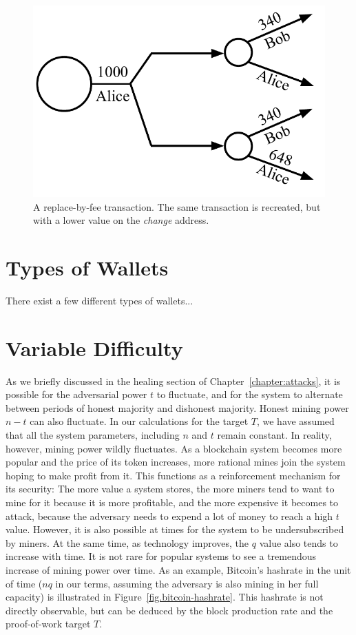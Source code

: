 \begin{figure}[h]
  \centering
  \includegraphics[width=0.4 \columnwidth,keepaspectratio]{figures/replace-by-fee.pdf}
  \caption{A replace-by-fee transaction. The same transaction is recreated, but with
           a lower value on the \emph{change} address.}
  \label{fig.replace-by-fee}
\end{figure}

\section{Types of Wallets}

There exist a few different types of wallets...

\section{Variable Difficulty}

As we briefly discussed in the healing section of Chapter~\ref{chapter:attacks},
it is possible for the adversarial power $t$ to fluctuate, and for the system to
alternate between periods of honest majority and dishonest majority.
Honest mining power $n - t$ can also fluctuate. In our calculations for the target $T$,
we have assumed that all the system parameters, including $n$ and $t$ remain
constant. In reality, however, mining power wildly fluctuates. As a blockchain
system becomes more popular and the price of its token increases,
more rational mines join the system hoping to make profit from it. This functions
as a reinforcement mechanism for its security: The more value a system stores,
the more miners tend to want to mine for it because it is more profitable, and
the more expensive it becomes to attack, because the adversary needs to
expend a lot of money to reach a high $t$ value. However, it is also possible
at times for the system to be undersubscribed by miners.
At the same time, as technology improves, the $q$ value also tends to increase with time.
It is not rare for popular systems to see a tremendous increase of mining
power over time. As an example, Bitcoin's hashrate in the unit of time ($nq$
in our terms, assuming the adversary is also mining in her full capacity)
is illustrated in Figure~\ref{fig.bitcoin-hashrate}. This
hashrate is not directly observable, but can be deduced by the block
production rate and the proof-of-work target $T$.

